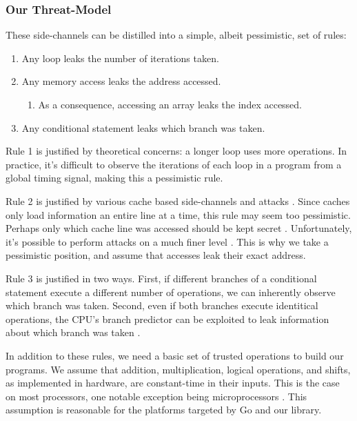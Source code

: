 \documentclass[11pt, a4paper]{article} %
\begin{document}
{\subsubsection{Our Threat-Model}
\label{threat_model}

These side-channels can be distilled into a simple,
albeit pessimistic, set of rules:

\begin{enumerate}
  \item Any loop leaks the number of iterations taken.
  \item Any memory access leaks the address accessed.
  \begin{enumerate}
    \item As a consequence, accessing an array leaks the index accessed.
  \end{enumerate}
  \item Any conditional statement leaks which branch was taken.
\end{enumerate}

Rule 1 is justified by theoretical concerns: a longer loop
uses more operations. In practice, it's difficult to observe
the iterations of each loop in a program from a global timing signal,
making this a pessimistic rule.

Rule 2 is justified by various cache based side-channels and attacks
\cite{
  bernstein_cache-timing_2005,
  yarom_cachebleed_2017,
  cabrera_aldaya_cache-timing_2019}.
Since caches only load information an entire line at a time,
this rule may seem too pessimistic. Perhaps only which cache line
was accessed should be kept secret \cite{brickell_technologies_2011}.
Unfortunately, it's possible to perform
attacks on a much finer level
\cite{
  bernstein_word_2013,
  osvik_cache_2006,
  yarom_cachebleed_2017}.
This is why we take a pessimistic position, and assume
that accesses leak their exact address.


Rule 3 is justified in two ways. First, if different branches of a conditional
statement execute a different number of operations,
we can inherently observe which branch was taken. Second, even if both
branches execute identitical operations, the CPU's branch predictor
can be exploited to leak information about which branch was taken
\cite{
  aciicmez_predicting_2006,
  aciicmez_power_2007,
  evtyushkin_jump_2016}.

In addition to these rules,
we need a basic set of trusted operations to build our programs.
We assume that addition, multiplication,
logical operations, and shifts, as implemented in hardware,
are constant-time in their inputs.
This is the case on most processors, one notable exception being
microprocessors
\cite{pornin_bearssl_nodate}. This assumption is reasonable
for the platforms targeted by Go and our library.

}
\end{document}
